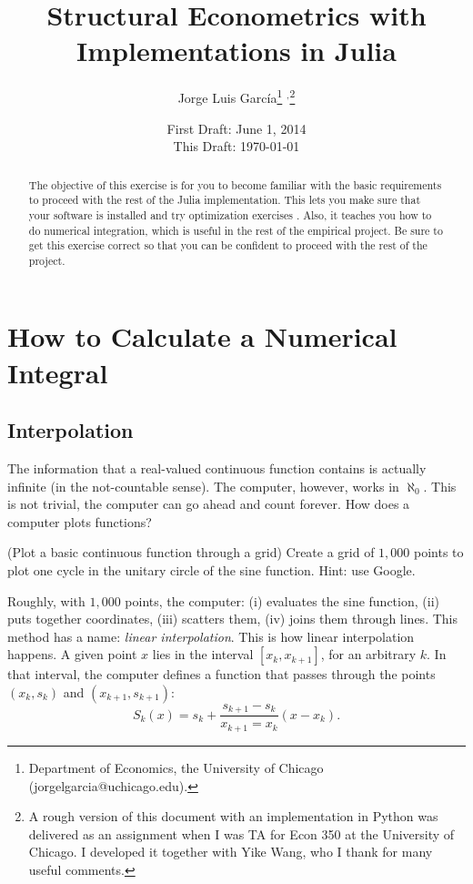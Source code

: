 



\title{\textbf{Structural Econometrics with Implementations in Julia}}
\author{Jorge Luis Garc\'{i}a\thanks{Department of Economics, the University of Chicago (jorgelgarcia@uchicago.edu).} $^{,}$\thanks{A rough version of this document with an implementation in Python was delivered as an assignment when I was TA for Econ 350 at the University of Chicago. I developed it together with Yike Wang, who I thank for many useful comments.}}
\date{First Draft: June 1, 2014 \\ This Draft: \today}
\maketitle

\begin{abstract}
\noindent The objective of this exercise is for you to become familiar with the basic requirements to proceed with the rest of the Julia implementation. This lets you make sure that your software is installed and try optimization exercises . Also, it teaches you how to do numerical integration, which is useful in the rest of the empirical project. Be sure to get this exercise correct so that you can be confident to proceed with the rest of the project. 
\end{abstract}

\section{How to Calculate a Numerical Integral}

\subsection{Interpolation}
The information that a real-valued continuous function contains is actually infinite (in the not-countable sense). The computer, however, works in $\aleph_{0}$. This is not trivial, the computer can go ahead and count forever. How does a computer plots functions?
\begin{exercise} (Plot a basic continuous function through a grid) \label{function:grid}
Create a grid of $1,000$ points to plot one cycle in the unitary circle of the sine function. Hint: use Google. 
\end{exercise} 

\indent Roughly, with $1,000$ points, the computer: (i) evaluates the sine function, (ii) puts together coordinates, (iii) scatters them, (iv) joins them through lines. This method has a name: \emph{linear interpolation}. This is how linear interpolation happens. A given point $x$ lies in the interval $[x_{k},x_{k+1}]$, for an arbitrary $k$. In that interval, the computer defines a function that passes through the points $(x_{k},s_{k})$ and $(x_{k+1},s_{k+1})$:
\begin{equation}
S_{k}(x) = s_{k} + \frac{s_{k+1} - s_{k}}{x_{k+1} = x_{k}} (x - x_{k}). \label{eq:interpol}
\end{equation}

